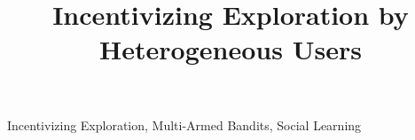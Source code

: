 \documentclass[twoside,11pt]{article}
\begin{document}
\title{Incentivizing Exploration by Heterogeneous Users}


\editor{}

\maketitle

\begin{abstract}

\end{abstract}

\begin{keywords}
Incentivizing Exploration, Multi-Armed Bandits, Social Learning
\end{keywords}

     

















\newpage

\appendix









% 


\end{document}

